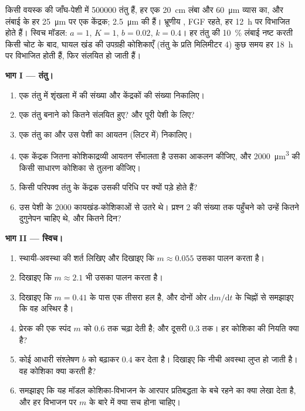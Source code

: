 \begin{problem}
\label{pb:b2:cell-differentiation:1}
किसी वयस्क की जाँघ-पेशी में \num{500000} तंतु हैं, हर एक
\qty{20}{cm} लंबा और \qty{60}{\micro m} व्यास का, और लंबाई के हर
\qty{25}{\micro m} पर एक केंद्रक; 
\qty{2.5}{\micro m} की हैं। भ्रूणीय , FGF रहते,
हर \qty{12}{h} पर विभाजित होते हैं। स्विच मॉडल: $a = 1$, $K = 1$, $b = 0.02$, $k
= 0.4$। हर तंतु की \qty{10}{\%} लंबाई नष्ट करती किसी चोट के बाद,
घायल खंड की उपग्रही कोशिकाएँ (तंतु के प्रति मिलिमीटर \num{4}) कुछ समय
हर \qty{18}{h} पर विभाजित होती हैं, फिर संलयित हो जाती हैं।

\medskip
\noindent\textbf{भाग I --- तंतु।}
\begin{enumerate}
  \item एक तंतु में शृंखला में  की संख्या और
        केंद्रकों की संख्या निकालिए।
  \item एक तंतु बनाने को कितने  संलयित हुए? और पूरी पेशी के लिए?
  \item एक तंतु का और उस पेशी का आयतन (लिटर में)
        निकालिए।
  \item एक केंद्रक जितना कोशिकाद्रव्यी आयतन सँभालता है उसका आकलन कीजिए, और
        \qty{2000}{\micro m^3} की किसी साधारण कोशिका से तुलना कीजिए।
  \item किसी परिपक्व तंतु के केंद्रक उसकी परिधि पर क्यों पड़े होते हैं?
  \item उस पेशी के  \num{2000} कायखंड-कोशिकाओं से उतरे थे।
        प्रश्न 2 की संख्या तक पहुँचने को उन्हें कितने दुगुनेपन चाहिए थे,
        और कितने दिन?
\end{enumerate}

\medskip
\noindent\textbf{भाग II --- स्विच।}
\begin{enumerate}[resume]
  \item स्थायी-अवस्था की शर्त लिखिए और दिखाइए कि $m \approx
        0.055$ उसका पालन करता है।
  \item दिखाइए कि $m \approx 2.1$ भी उसका पालन करता है।
  \item दिखाइए कि $m = 0.41$ के पास एक तीसरा हल है, और
        दोनों ओर $\mathrm{d}m/\mathrm{d}t$ के चिह्नों से
        समझाइए कि वह अस्थिर है।
  \item प्रेरक की एक स्पंद $m$ को $0.6$ तक चढ़ा देती है; और दूसरी $0.3$ तक।
        हर कोशिका की नियति क्या है?
  \item कोई  आधारी संश्लेषण $b$ को बढ़ाकर $0.4$ कर देता है।
        दिखाइए कि नीची अवस्था लुप्त हो जाती है। वह कोशिका क्या करती है?
  \item समझाइए कि यह मॉडल कोशिका-विभाजन के आरपार प्रतिबद्धता के बचे
        रहने का क्या लेखा देता है, और हर विभाजन पर $m$ के बारे में क्या सच होना चाहिए।
\end{enumerate}


\end{problem}
